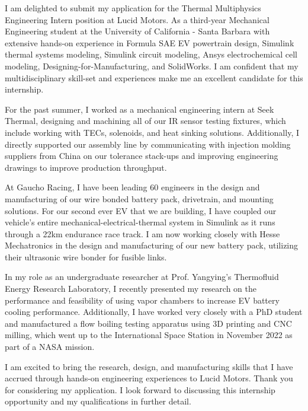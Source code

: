 \documentclass[11pt, letterpaper]{awesome-cv} %
\begin{document}
\makecvheader %

\makelettertitle %


\begin{cvletter}


I am delighted to submit my application for the Thermal Multiphysics Engineering Intern position at Lucid Motors. As a third-year Mechanical Engineering student at the University of California - Santa Barbara with extensive hands-on experience in Formula SAE EV powertrain design, Simulink thermal systems modeling, Simulink circuit modeling, Ansys electrochemical cell modeling, Designing-for-Manufacturing, and  SolidWorks. I am confident that my multidisciplinary skill-set and experiences make me an excellent candidate for this internship.

For the past summer, I worked as a mechanical engineering intern at Seek Thermal, designing and machining all of our IR sensor testing fixtures, which include working with TECs, solenoids, and heat sinking solutions. Additionally, I directly supported our assembly line by communicating with injection molding suppliers from China on our tolerance stack-ups and improving engineering drawings to improve production throughput. 

At Gaucho Racing, I have been leading 60 engineers in the design and manufacturing of our wire bonded battery pack, drivetrain, and mounting solutions. For our second ever EV that we are building, I have coupled our vehicle's entire mechanical-electrical-thermal system in Simulink as it runs through a 22km endurance race track. I am now working closely with Hesse Mechatronics in the design and manufacturing of our new battery pack, utilizing their ultrasonic wire bonder for fusible links. 

In my role as an undergraduate researcher at Prof. Yangying's Thermofluid Energy Research Laboratory, I recently presented my research on the performance and feasibility of using vapor chambers to increase EV battery cooling performance. Additionally, I have worked very closely with a PhD student and manufactured a flow boiling testing apparatus using 3D printing and CNC milling, which went up to the International Space Station in November 2022 as part of a NASA mission. 

I am excited to bring the research, design, and manufacturing skills that I have accrued through hands-on engineering experiences to Lucid Motors. Thank you for considering my application. I look forward to discussing this internship opportunity and my qualifications in further detail.


\end{cvletter}


\makeletterclosing %
\end{document}
